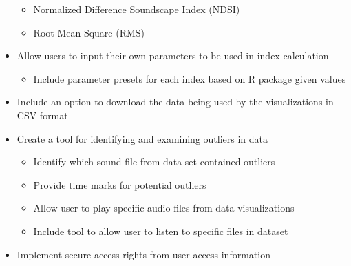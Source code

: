 \begin{itemize}
\begin{itemize}
      \item Normalized Difference Soundscape Index (NDSI)
      \item Root Mean Square (RMS)
    \end{itemize}
  \item Allow users to input their own parameters to be used in index calculation
    \begin{itemize}
      \item Include parameter presets for each index based on R package given values
    \end{itemize}
  \item Include an option to download the data being used by the visualizations in CSV format
  \item Create a tool for identifying and examining outliers in data
    \begin{itemize}
      \item Identify which sound file from data set contained outliers
      \item Provide time marks for potential outliers
      \item Allow user to play specific audio files from data visualizations
      \item Include tool to allow user to listen to specific files in dataset
    \end{itemize}
  \item Implement secure access rights from user access information
\end{itemize}
